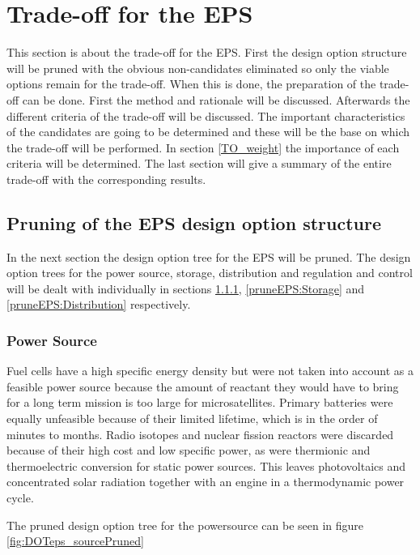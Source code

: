 \section{Trade-off for the \acl{EPS}}
\label{TO_EPS}
This section is about the trade-off for the \ac{EPS}. First the design option structure will be pruned
with the obvious non-candidates eliminated so only the viable options remain for the trade-off.
When this is done, the preparation of the trade-off can be done. First the method and rationale will be discussed.
Afterwards the different criteria of the trade-off will be discussed. The important characteristics of the candidates are going to be
determined and these will be the base on which the trade-off will be performed. In section \ref{TO_weight} the importance of each criteria
will be determined. The last section will give a summary of the entire trade-off with the corresponding results.

\subsection{Pruning of the EPS design option structure}
\label{pruneEPS}
In the next section the design option tree for the \ac{EPS} will be pruned. The design option trees for the power source, storage, distribution and regulation and control will be dealt with individually in sections \ref{pruneEPS:Source}, \ref{pruneEPS:Storage} and \ref{pruneEPS:Distribution} respectively.

\subsubsection{Power Source}
\label{pruneEPS:Source}
Fuel cells have a high specific energy density but were not taken into account as a feasible power source because the amount of reactant they would have to bring for a long term mission is too large for microsatellites. Primary batteries were equally unfeasible because of their limited lifetime, which is in the order of minutes to months. Radio isotopes and nuclear fission reactors were discarded because of their high cost and low specific power, as were thermionic and thermoelectric conversion for static power sources.
This leaves photovoltaics and concentrated solar radiation together with an engine in a thermodynamic power cycle.

The pruned design option tree for the powersource can be seen in figure \ref{fig:DOTeps_sourcePruned}

